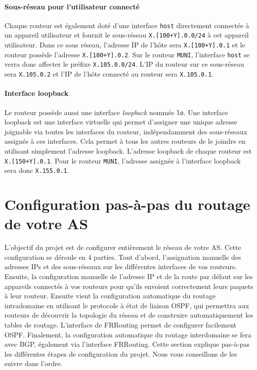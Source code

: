 \documentclass[a4paper, 11pt]{article}
\begin{document}
\paragraph*{Sous-réseau pour l'utilisateur connecté}
Chaque routeur est également doté d'une interface \texttt{host}
directement connectée
à un appareil utilisateur et fournit le sous-réseau
\texttt{X.[100+Y].0.0/24} à cet appareil utilisateur.
Dans ce sous réseau, l'adresse IP de l'hôte sera \texttt{X.[100+Y].0.1}
et le routeur possède l'adresse \texttt{X.[100+Y].0.2}. Sur le routeur
\texttt{MUNI}, l'interface \texttt{host} se verra donc affecter
le préfixe \texttt{X.105.0.0/24}. L'IP du routeur sur ce sous-réseau
sera \texttt{X.105.0.2} et l'IP de l'hôte connecté au routeur
sera \texttt{X.105.0.1}.

\paragraph*{Interface loopback}
Le routeur possède aussi
une interface \textit{loopback} nommée \texttt{lo}. Une interface loopback
est une interface virtuelle qui permet d'assigner une unique adresse
joignable via toutes les interfaces du routeur, indépendamment des
sous-réseaux assignés à ces interfaces. Cela permet à tous les autres
routeurs de le joindre en utilisant simplement l'adresse loopback.
L'adresse loopback de chaque routeur est \texttt{X.[150+Y].0.1}.
Pour le routeur \texttt{MUNI}, l'adresse assignée à l'interface
loopback sera donc \texttt{X.155.0.1}.


\section{Configuration pas-à-pas du routage de votre AS}


L'objectif du projet est de configurer entièrement le réseau de votre AS.
Cette configuration se déroule en 4 parties. Tout d'abord, l'assignation
manuelle des adresses IPs et des sous-réseaux sur les différentes interfaces
de vos routeurs. Ensuite, la configuration manuelle de l'adresse IP et de la
route par défaut sur les appareils connectés à vos routeurs pour qu'ils
envoient correctement leurs paquets à leur routeur.
Ensuite vient la configuration automatique du routage intradomaine
en utilisant le protocole à état de liaison OSPF, qui permettra aux routeurs
de découvrir la topologie du réseau et de construire automatiquement
les tables de routage. L'interface de FRRouting permet de configurer
facilement OSPF. Finalement, la configuration automatique du routage
interdomaine se fera avec BGP, également via l'interface FRRouting.
Cette section explique pas-à-pas les différentes étapes de configuration
du projet. Nous vous conseillons de les suivre dans l'ordre.
\end{document}
